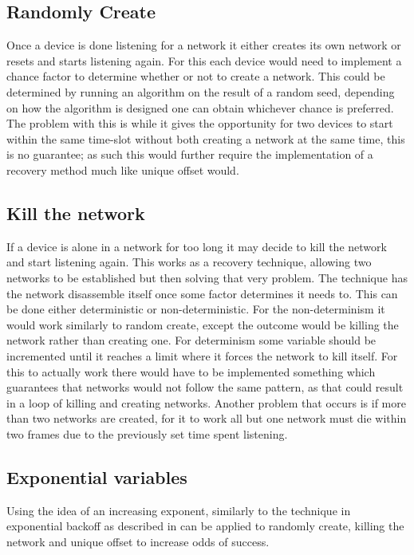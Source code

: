 \subsection{Randomly Create}\label{RCreate}
Once a device is done listening for a network it either creates its own network or resets and starts listening again.
For this each device would need to implement a chance factor to determine whether or not to create a network.
This could be determined by running an algorithm on the result of a random seed, depending on how the algorithm is designed one can obtain whichever chance is preferred.
The problem with this is while it gives the opportunity for two devices to start within the same time-slot without both creating a network at the same time, this is no guarantee; as such this would further require the implementation of a recovery method much like unique offset would.

\subsection{Kill the network}\label{KtN}
If a device is alone in a network for too long it may decide to kill the network and start listening again.
This works as a recovery technique, allowing two networks to be established but then solving that very problem.
The technique has the network disassemble itself once some factor determines it needs to.
This can be done either deterministic or non-deterministic.
For the non-determinism it would work similarly to random create, except the outcome would be killing the network rather than creating one.
For determinism some variable should be incremented until it reaches a limit where it forces the network to kill itself.
For this to actually work there would have to be implemented something which guarantees that networks would not follow the same pattern, as that could result in a loop of killing and creating networks.
Another problem that occurs is if more than two networks are created, for it to work all but one network must die within two frames due to the previously set time spent listening.

\subsection{Exponential variables} 
Using the idea of an increasing exponent, similarly to the technique in exponential backoff as described in  can be applied to randomly create, killing the network and unique offset to increase odds of success.
